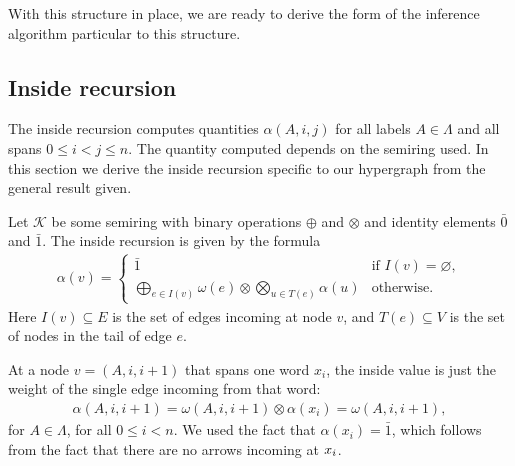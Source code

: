  With this structure in place, we are ready to derive the form of the inference algorithm particular to this structure.


\subsection{Inside recursion}
  The inside recursion computes quantities $\alpha(A,i,j)$ for all labels $A \in \Lambda$ and all spans $0 \leq i < j \leq n$. The quantity computed depends on the semiring used. In this section we derive the inside recursion specific to our hypergraph from the general result given.

  Let $\mathcal{K}$ be some semiring with binary operations $\oplus$ and $\otimes$ and identity elements $\bar{0}$ and $\bar{1}$. The inside recursion is given by the formula \citep{goodman1999semiring}
  \begin{align*}
    \alpha(v) =
      \begin{cases}
        \bar{1}  &  \mbox{if } I(v) = \varnothing,  \\
        \displaystyle\bigoplus_{e \in I(v)} \omega(e) \otimes \displaystyle\bigotimes_{u \in T(e)} \alpha(u)  & \mbox{otherwise.}
      \end{cases}
  \end{align*}
  Here $I(v) \subseteq E$ is the set of edges incoming at node $v$, and $T(e) \subseteq V$ is the set of nodes in the tail of edge $e$.

  At a node $v = (A, i, i+1)$ that spans one word $x_i$, the inside value is just the weight of the single edge incoming from that word:
  \begin{align}
      \label{eq:inside-base}
      \alpha(A, i, i+1) = \omega(A, i, i+1) \otimes \alpha(x_i) = \omega(A, i, i+1),
  \end{align}
  for $A \in \Lambda$, for all $0 \leq i < n$. We used the fact that $\alpha(x_i) = \bar{1}$, which follows from the fact that there are no arrows incoming at $x_i$.

